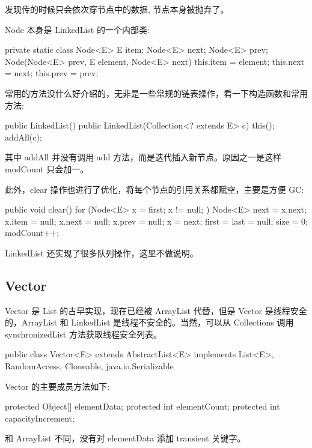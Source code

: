 发现传的时候只会依次穿节点中的数据, 节点本身被抛弃了。

Node 本身是 LinkedList 的一个内部类:

\begin{Java}
private static class Node<E> {
    E item;
    Node<E> next;
    Node<E> prev;
    Node(Node<E> prev, E element, Node<E> next) {
        this.item = element;
        this.next = next;
        this.prev = prev;
    }
}
\end{Java}

常用的方法没什么好介绍的，无非是一些常规的链表操作，看一下构造函数和常用方法:

\begin{Java}
public LinkedList() { }
public LinkedList(Collection<? extends E> c) {
    this();
    addAll(c);
}
\end{Java}

其中 addAll 并没有调用 add 方法，而是迭代插入新节点。原因之一是这样 modCount 只会加一。

此外，clear 操作也进行了优化，将每个节点的引用关系都赋空，主要是方便 GC:

\begin{Java}
public void clear() {
    for (Node<E> x = first; x != null; ) {
        Node<E> next = x.next;
        x.item = null;
        x.next = null;
        x.prev = null;
        x = next;
    }
    first = last = null;
    size = 0;
    modCount++;
}
\end{Java}

LinkedList 还实现了很多队列操作，这里不做说明。

\subsection{Vector}

Vector 是 List 的古早实现，现在已经被 ArrayList 代替，但是 Vector 是线程安全的，ArrayList 和 LinkedList 是线程不安全的。当然，可以从 Collections 调用 synchronizedList 方法获取线程安全列表。

\begin{Java}
public class Vector<E> extends AbstractList<E> implements List<E>, RandomAccess, Cloneable, java.io.Serializable
\end{Java}

Vector 的主要成员方法如下:
\begin{Java}
protected Object[] elementData;
protected int elementCount;
protected int capacityIncrement;
\end{Java}

和 ArrayList 不同，没有对 elementData 添加 transient 关键字。

